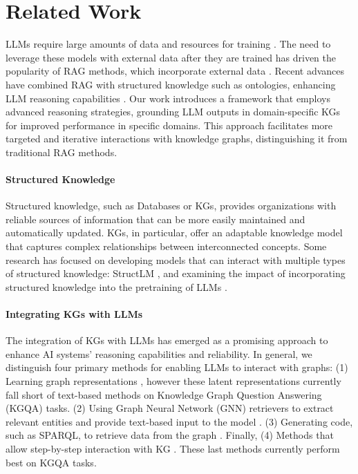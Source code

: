\section{Related Work}

LLMs require large amounts of data and resources for training \cite{villalobos2024will}. The need to leverage these models with external data after they are trained has driven the popularity of RAG methods, which incorporate external data \citep{rag, demonstrate-search-predict}. Recent advances have combined RAG with structured knowledge such as ontologies, enhancing LLM reasoning capabilities \cite{li2024structrag}. Our work introduces a framework that employs advanced reasoning strategies, grounding LLM outputs in domain-specific KGs for improved performance in specific domains.  This approach facilitates more targeted and iterative interactions with knowledge graphs, distinguishing it from traditional RAG methods.

\paragraph{Structured Knowledge} Structured knowledge, such as Databases or KGs, provides organizations with reliable sources of information that can be more easily maintained and automatically updated. KGs, in particular, offer an adaptable knowledge model that captures complex relationships between interconnected concepts. Some research has focused on developing models that can interact with multiple types of structured knowledge: StructLM  \citep{structLM}, and examining the impact of incorporating structured knowledge into the pretraining of LLMs  \citep{skill_llm_structured_knowledge_infusion}. 


\paragraph{Integrating KGs with LLMs} \citep{peng2024graph} The integration of KGs with LLMs has emerged as a promising approach to enhance AI systems' reasoning capabilities and reliability. In general, we distinguish four primary methods for enabling LLMs to interact with graphs: (1) Learning graph representations \citep{let_graph_do_thinking, graphllm}, however these latent representations currently fall short of text-based methods on Knowledge Graph Question Answering (KGQA) tasks. (2) Using Graph Neural Network (GNN) retrievers to extract relevant entities and provide text-based input to the model \citep{g-retriever, gnn-rag}. (3) Generating code, such as SPARQL, to retrieve data from the graph \citep{kb-binder}. Finally, (4) Methods that allow step-by-step interaction with KG \citep{rog, decaf, chatkbqa}. These last methods currently perform best on KGQA tasks.

